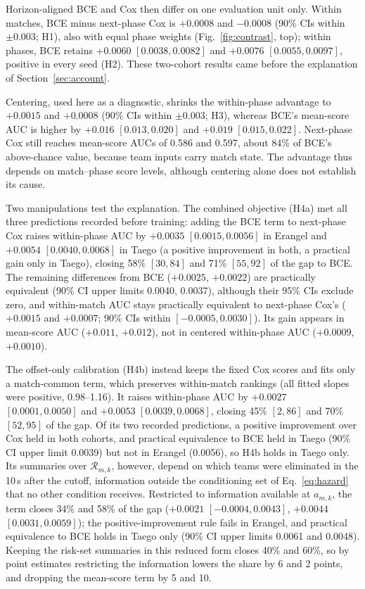 \documentclass[sigconf,anonymous]{acmart}
\begin{document}
Horizon-aligned BCE and Cox then differ on one evaluation unit only. Within matches, BCE minus next-phase Cox is $+0.0008$ and $-0.0008$ (90\% CIs within $\pm0.003$; H1), also with equal phase weights (Fig.~\ref{fig:contrast}, top); within phases, BCE retains $+0.0060$ $[0.0038,\allowbreak 0.0082]$ and $+0.0076$ $[0.0055,\allowbreak 0.0097]$, positive in every seed (H2). These two-cohort results came before the explanation of Section~\ref{sec:account}.

Centering, used here as a diagnostic, shrinks the within-phase advantage to $+0.0015$ and $+0.0008$ (90\% CIs within $\pm0.003$; H3), whereas BCE's mean-score AUC is higher by $+0.016$ $[0.013,\allowbreak 0.020]$ and $+0.019$ $[0.015,\allowbreak 0.022]$. Next-phase Cox still reaches mean-score AUCs of 0.586 and 0.597, about 84\% of BCE's above-chance value, because team inputs carry match state. The advantage thus depends on match--phase score levels, although centering alone does not establish its cause.

Two manipulations test the explanation. The combined objective (H4a) met all three predictions recorded before training: adding the BCE term to next-phase Cox raises within-phase AUC by $+0.0035$ $[0.0015,\allowbreak 0.0056]$ in Erangel and $+0.0054$ $[0.0040,\allowbreak 0.0068]$ in Taego (a positive improvement in both, a practical gain only in Taego), closing 58\% $[30,\allowbreak 84]$ and 71\% $[55,\allowbreak 92]$ of the gap to BCE. The remaining differences from BCE ($+0.0025$, $+0.0022$) are practically equivalent (90\% CI upper limits 0.0040, 0.0037), although their 95\% CIs exclude zero, and within-match AUC stays practically equivalent to next-phase Cox's ($+0.0015$ and $+0.0007$; 90\% CIs within $[-0.0005,\allowbreak 0.0030]$). Its gain appears in mean-score AUC ($+0.011$, $+0.012$), not in centered within-phase AUC ($+0.0009$, $+0.0010$).

The offset-only calibration (H4b) instead keeps the fixed Cox scores and fits only a match-common term, which preserves within-match rankings (all fitted slopes were positive, 0.98--1.16). It raises within-phase AUC by $+0.0027$ $[0.0001,\allowbreak 0.0050]$ and $+0.0053$ $[0.0039,\allowbreak 0.0068]$, closing 45\% $[2,\allowbreak 86]$ and 70\% $[52,\allowbreak 95]$ of the gap. Of its two recorded predictions, a positive improvement over Cox held in both cohorts, and practical equivalence to BCE held in Taego (90\% CI upper limit 0.0039) but not in Erangel (0.0056), so H4b holds in Taego only. Its summaries over $\mathcal{R}_{m,k}$, however, depend on which teams were eliminated in the 10\,s after the cutoff, information outside the conditioning set of Eq.~\eqref{eq:hazard} that no other condition receives. Restricted to information available at $a_{m,k}$, the term closes 34\% and 58\% of the gap ($+0.0021$ $[-0.0004,\allowbreak 0.0043]$, $+0.0044$ $[0.0031,\allowbreak 0.0059]$); the positive-improvement rule fails in Erangel, and practical equivalence to BCE holds in Taego only (90\% CI upper limits 0.0061 and 0.0048). Keeping the risk-set summaries in this reduced form closes 40\% and 60\%, so by point estimates restricting the information lowers the share by 6 and 2 points, and dropping the mean-score term by 5 and 10.
\end{document}
